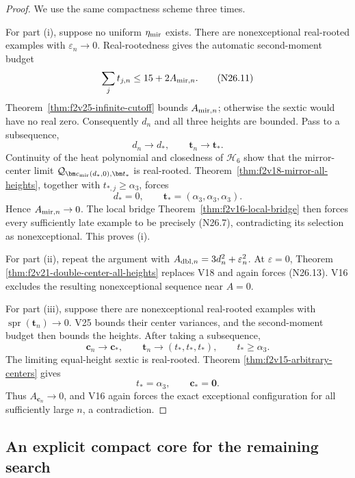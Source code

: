 \documentclass[11pt]{article}
\theoremstyle{definition}
\theoremstyle{remark}
\begin{document}
\begin{proof}
We use the same compactness scheme three times.

For part \textup{(i)}, suppose no uniform \(\eta_{\rm mir}\) exists.
There are nonexceptional real-rooted examples with
\(\varepsilon_n\to0\).  Real-rootedness gives the automatic
second-moment budget
\[
 \sum_jt_{j,n}\leq15+2A_{{\rm mir},n}.
 \tag{N26.11}
\]
Theorem~\ref{thm:f2v25-infinite-cutoff} bounds \(A_{{\rm mir},n}\);
otherwise the sextic would have no real zero.  Consequently \(d_n\) and
all three heights are bounded.  Pass to a subsequence,
\[
 d_n\to d_\ast,\qquad \bm t_n\to\bm t_\ast.
 \tag{N26.12}
\]
Continuity of the heat polynomial and closedness of \(\mathcal H_6\)
show that the mirror-center limit
\(\mathcal Q_{\bm c_{\rm mir}(d_\ast,0),\bm t_\ast}\) is real-rooted.
Theorem~\ref{thm:f2v18-mirror-all-heights}, together with
\(t_{\ast,j}\geq\alpha_3\), forces
\[
 d_\ast=0,\qquad
 \bm t_\ast=(\alpha_3,\alpha_3,\alpha_3).
 \tag{N26.13}
\]
Hence \(A_{{\rm mir},n}\to0\).  The local bridge
Theorem~\ref{thm:f2v16-local-bridge} then forces every sufficiently late
example to be precisely \textup{(N26.7)}, contradicting its selection as
nonexceptional.  This proves \textup{(i)}.

For part \textup{(ii)}, repeat the argument with
\(A_{{\rm dbl},n}=3d_n^2+\varepsilon_n^2\).  At
\(\varepsilon=0\), Theorem
\ref{thm:f2v21-double-center-all-heights} replaces V18 and again forces
\textup{(N26.13)}.  V16 excludes the resulting nonexceptional sequence
near \(A=0\).

For part \textup{(iii)}, suppose there are nonexceptional real-rooted
examples with \(\operatorname{spr}(\bm t_n)\to0\).  V25 bounds their
center variances, and the second-moment budget then bounds the heights.
After taking a subsequence,
\[
 \bm c_n\to\bm c_\ast,\qquad
 \bm t_n\to(t_\ast,t_\ast,t_\ast),
 \qquad t_\ast\geq\alpha_3.
 \tag{N26.14}
\]
The limiting equal-height sextic is real-rooted.  Theorem
\ref{thm:f2v15-arbitrary-centers} gives
\[
 t_\ast=\alpha_3,\qquad \bm c_\ast=\bm0.
 \tag{N26.15}
\]
Thus \(A_{\bm c_n}\to0\), and V16 again forces the exact exceptional
configuration for all sufficiently large \(n\), a contradiction.
\end{proof}

\subsection{An explicit compact core for the remaining search}
\label{subsec:f2v26-core}
\end{document}
